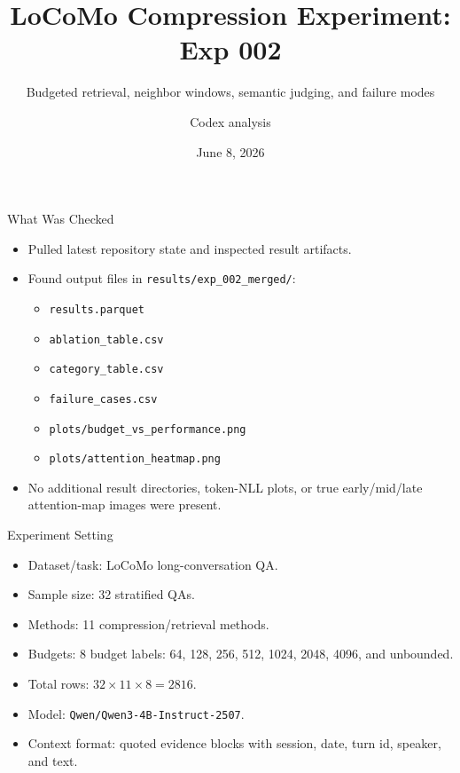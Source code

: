 \documentclass[aspectratio=169]{beamer}
\title[LoCoMo Compression Experiment]{LoCoMo Compression Experiment: Exp 002}
\subtitle{Budgeted retrieval, neighbor windows, semantic judging, and failure modes}
\author{Codex analysis}
\date{June 8, 2026}
\newcommand{\method}[1]{\texttt{#1}}
\begin{document}
\begin{frame}
  \titlepage
\end{frame}

\begin{frame}{What Was Checked}
\begin{itemize}
  \item Pulled latest repository state and inspected result artifacts.
  \item Found output files in \method{results/exp\_002\_merged/}:
  \begin{itemize}
    \item \method{results.parquet}
    \item \method{ablation\_table.csv}
    \item \method{category\_table.csv}
    \item \method{failure\_cases.csv}
    \item \method{plots/budget\_vs\_performance.png}
    \item \method{plots/attention\_heatmap.png}
  \end{itemize}
  \item No additional result directories, token-NLL plots, or true early/mid/late attention-map images were present.
\end{itemize}
\end{frame}

\begin{frame}{Experiment Setting}
\begin{itemize}
  \item Dataset/task: LoCoMo long-conversation QA.
  \item Sample size: 32 stratified QAs.
  \item Methods: 11 compression/retrieval methods.
  \item Budgets: 8 budget labels: 64, 128, 256, 512, 1024, 2048, 4096, and unbounded.
  \item Total rows: \(32 \times 11 \times 8 = 2816\).
  \item Model: \method{Qwen/Qwen3-4B-Instruct-2507}.
  \item Context format: quoted evidence blocks with session, date, turn id, speaker, and text.
\end{itemize}
\end{frame}
\end{document}
